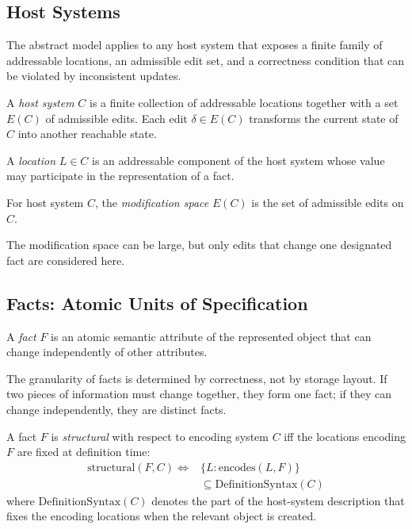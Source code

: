 
\subsection{Host Systems}\label{sec:edit-space}

The abstract model applies to any host system that exposes a finite family of addressable locations, an admissible edit set, and a correctness condition that can be violated by inconsistent updates.

\begin{definition}
A \emph{host system} $C$ is a finite collection of addressable locations together with a set $E(C)$ of admissible edits. Each edit $\delta\in E(C)$ transforms the current state of $C$ into another reachable state.
\end{definition}

\begin{definition}[Location]
A \emph{location} $L\in C$ is an addressable component of the host system whose value may participate in the representation of a fact.
\end{definition}

\begin{definition}
For host system $C$, the \emph{modification space} $E(C)$ is the set of admissible edits on $C$.
\end{definition}

The modification space can be large, but only edits that change one designated fact are considered here.

\subsection{Facts: Atomic Units of Specification}\label{sec:facts}

\begin{definition}[Fact]\label{def:fact}
A \emph{fact} $F$ is an atomic semantic attribute of the represented object that can change independently of other attributes.
\end{definition}

The granularity of facts is determined by correctness, not by storage layout. If two pieces of information must change together, they form one fact; if they can change independently, they are distinct facts.

\begin{definition}\label{def:structural-fact}
A fact $F$ is \emph{structural} with respect to encoding system $C$ iff the locations encoding $F$ are fixed at definition time:
\[
\begin{aligned}
\text{structural}(F, C) \Longleftrightarrow {} &
\{L : \text{encodes}(L, F)\} \\
& \subseteq \text{DefinitionSyntax}(C)
\end{aligned}
\]
where $\text{DefinitionSyntax}(C)$ denotes the part of the host-system description that fixes the encoding locations when the relevant object is created.
\end{definition}

